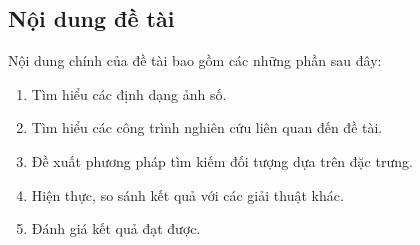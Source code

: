 \documentclass[a4paper,14pt]{extreport}
\begin{document}
\subsection{Nội dung đề tài}
Nội dung chính của đề tài bao gồm các những phần sau đây:
\begin{enumerate}
    \item Tìm hiểu các định dạng ảnh số.
    \item Tìm hiểu các công trình nghiên cứu liên quan đến đề tài.
    \item Đề xuất phương pháp tìm kiếm đối tượng dựa trên đặc trưng.
    \item Hiện thực, so sánh kết quả với các giải thuật khác.
    \item Đánh giá kết quả đạt được.
\end{enumerate}


\end{document}
